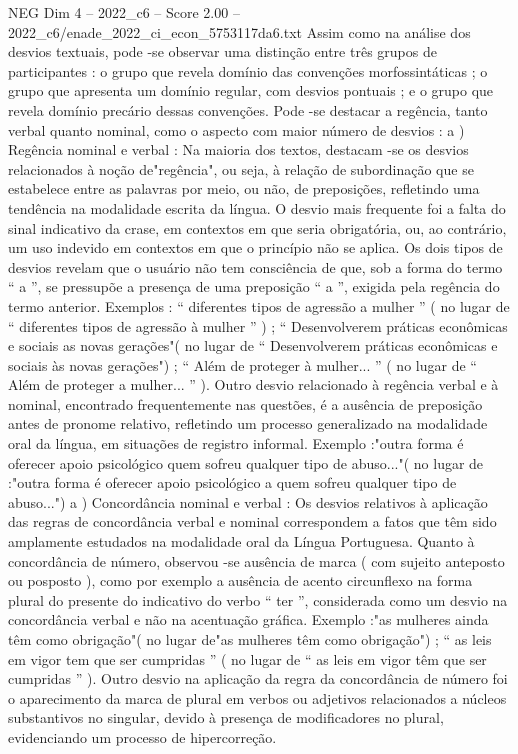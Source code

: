 \begin{textsample}{NEG Dim 4 – 2022\_c6 – Score 2.00 – 2022\_c6/enade\_2022\_ci\_econ\_5753117da6.txt}
Assim como na análise dos desvios textuais, pode -se observar uma distinção entre três grupos de participantes : o grupo que revela domínio das convenções morfossintáticas ; o grupo que apresenta um domínio regular, com desvios pontuais ; e o grupo que revela domínio precário dessas convenções.
Pode -se destacar a regência, tanto verbal quanto nominal, como o aspecto com maior número de desvios : a ) Regência nominal e verbal : Na maioria dos textos, destacam -se os desvios relacionados à noção de"regência", ou seja, à relação de subordinação que se estabelece entre as palavras por meio, ou não, de preposições, refletindo uma tendência na modalidade escrita da língua.
O desvio mais frequente foi a falta do sinal indicativo da crase, em contextos em que seria obrigatória, ou, ao contrário, um uso indevido em contextos em que o princípio não se aplica.
Os dois tipos de desvios revelam que o usuário não tem consciência de que, sob a forma do termo “ a ”, se pressupõe a presença de uma preposição “ a ”, exigida pela regência do termo anterior.
Exemplos : “ diferentes tipos de agressão a mulher ” ( no lugar de “ diferentes tipos de agressão à mulher ” ) ; “ Desenvolverem práticas econômicas e sociais as novas gerações"( no lugar de “ Desenvolverem práticas econômicas e sociais às novas gerações") ; “ Além de proteger à mulher... ” ( no lugar de “ Além de proteger a mulher... ” ).
Outro desvio relacionado à regência verbal e à nominal, encontrado frequentemente nas questões, é a ausência de preposição antes de pronome relativo, refletindo um processo generalizado na modalidade oral da língua, em situações de registro informal.
Exemplo :"outra forma é oferecer apoio psicológico quem sofreu qualquer tipo de abuso..."( no lugar de :"outra forma é oferecer apoio psicológico a quem sofreu qualquer tipo de abuso...") a ) Concordância nominal e verbal : Os desvios relativos à aplicação das regras de concordância verbal e nominal correspondem a fatos que têm sido amplamente estudados na modalidade oral da Língua Portuguesa.
Quanto à concordância de número, observou -se ausência de marca ( com sujeito anteposto ou posposto ), como por exemplo a ausência de acento circunflexo na forma plural do presente do indicativo do verbo “ ter ”, considerada como um desvio na concordância verbal e não na acentuação gráfica.
Exemplo :"as mulheres ainda têm como obrigação"( no lugar de"as mulheres têm como obrigação") ; “ as leis em vigor tem que ser cumpridas ” ( no lugar de “ as leis em vigor têm que ser cumpridas ” ).
Outro desvio na aplicação da regra da concordância de número foi o aparecimento da marca de plural em verbos ou adjetivos relacionados a núcleos substantivos no singular, devido à presença de modificadores no plural, evidenciando um processo de hipercorreção.

\end{textsample}
